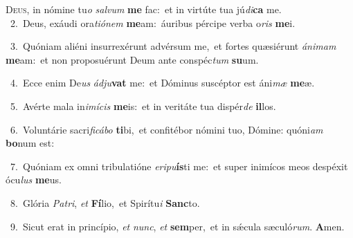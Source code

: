 \lettrine{\initial\textcolor{\initialcolor}{D}}{eus,} in nómine tu\textit{o} \textit{sal}\-\textit{vum} \textbf{me} fac:~\star et in virtúte tua jú\-\textit{di}\-\textbf{ca} me.\\
{\numbfont\textcolor{\numbcolor}{~2.}}~Deus, exáudi ora\-\textit{ti}\-\textit{ó}\textit{nem} \textbf{me}\-am:~\star áuribus pércipe verba o\textit{ris} \textbf{me}\-i.\par
{\numbfont\textcolor{\numbcolor}{~3.}}~Quóniam aliéni insurrexérunt advérsum me,~\dagger et fortes quæsiérunt \textit{á}\-\textit{ni}\textit{mam} \textbf{me}\-am:~\star et non proposuérunt Deum ante conspéc\textit{tum} \textbf{su}\-um.\par
{\numbfont\textcolor{\numbcolor}{~4.}}~Ecce enim De\textit{us} \textit{ád}\-\textit{ju}\textbf{vat} me:~\star et Dóminus suscéptor est áni\textit{mæ} \textbf{me}\-æ.\par
{\numbfont\textcolor{\numbcolor}{~5.}}~Avérte mala in\-\textit{i}\-\textit{mí}\textit{cis} \textbf{me}\-is:~\star et in veritáte tua dispér\textit{de} \textbf{il}\-los.\par
{\numbfont\textcolor{\numbcolor}{~6.}}~Voluntárie sacri\-\textit{fi}\-\textit{cá}\textit{bo} \textbf{ti}\-bi,~\star et confitébor nómini tuo, Dómine: quóni\textit{am} \textbf{bo}\-num est:\par
{\numbfont\textcolor{\numbcolor}{~7.}}~Quóniam ex omni tribulatióne \textit{e}\-\textit{ri}\textit{pu}\textbf{ís}ti me:~\star et super inimícos meos despéxit ócu\textit{lus} \textbf{me}\-us.\par
{\numbfont\textcolor{\numbcolor}{~8.}}~Glória \textit{Pa}\-\textit{tri}, \textit{et} \textbf{Fí}\-lio,~\star et Spirítu\textit{i} \textbf{Sanc}\-to.\par
{\numbfont\textcolor{\numbcolor}{~9.}}~Sicut erat in princípio, \textit{et} \textit{nunc}\-, \textit{et} \textbf{sem}\-per,~\star et in sǽcula sæculó\-\textit{rum}\-. \textbf{A}\-men.\par
